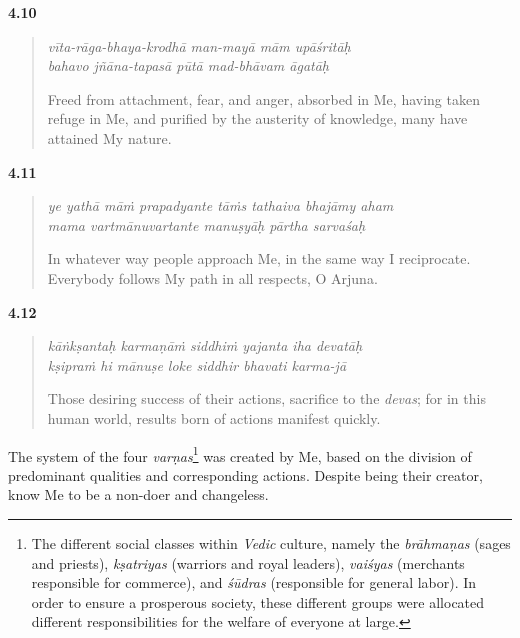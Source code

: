 \par\noindent\textbf{4.10}\par
\begin{verse}
\textit{vīta-rāga-bhaya-krodhā man-mayā mām upāśritāḥ} \\
\textit{bahavo jñāna-tapasā pūtā mad-bhāvam āgatāḥ}

\noindent Freed from attachment, fear, and anger, absorbed in Me, having taken refuge in Me, and purified by the austerity of knowledge, many have attained My nature.
\end{verse}
\par



\par\noindent\textbf{4.11}\par
\begin{verse}
\textit{ye yathā māṁ prapadyante tāṁs tathaiva bhajāmy aham} \\
\textit{mama vartmānuvartante manuṣyāḥ pārtha sarvaśaḥ}

\noindent In whatever way people approach Me, in the same way I reciprocate. Everybody follows My path in all respects, O Arjuna.
\end{verse}
\par



\par\noindent\textbf{4.12}\par
\begin{verse}
\textit{kāṅkṣantaḥ karmaṇāṁ siddhiṁ yajanta iha devatāḥ} \\
\textit{kṣipraṁ hi mānuṣe loke siddhir bhavati karma-jā}

\noindent Those desiring success of their actions, sacrifice to the \textit{devas}; for in this human world, results born of actions manifest quickly.
\end{verse}
\par


{The system of the four \textit{varṇas}\footnote{The different social classes within \textit{Vedic} culture, namely the \textit{brāhmaṇas} (sages and priests), \textit{kṣatriyas} (warriors and royal leaders), \textit{vaiśyas} (merchants responsible for commerce), and \textit{śūdras} (responsible for general labor). In order to ensure a prosperous society, these different groups were allocated different responsibilities for the welfare of everyone at large.} was created by Me, based on the division of predominant qualities and corresponding actions. Despite being their creator, know Me to be a non-doer and changeless.}


